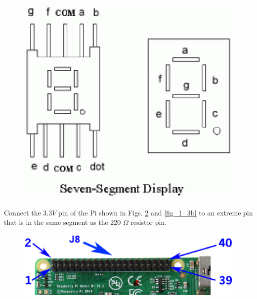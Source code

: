 \begin{figure}
\begin{center}
\includegraphics[width=\columnwidth]{./chapter1/figs/sevenseg}
\end{center}
\label{fig_1_2}
\end{figure}	%
\begin{problem}
	Connect the 3.3$V$ pin of the Pi shown in Figs. \ref{fig_1_3a} and  \ref{fig_1_3b}  to an  extreme pin that is in the same segment as the 220 $\Omega$ resistor pin. 
\end{problem}	
\renewcommand{\thefigure}{\theproblem.\arabic{figure}}
\begin{figure}[!ht]
\begin{center}
\includegraphics[width=\columnwidth]{./chapter1/figs/gpio2}
\end{center}
\label{fig_1_3a}	
\end{figure}
%
